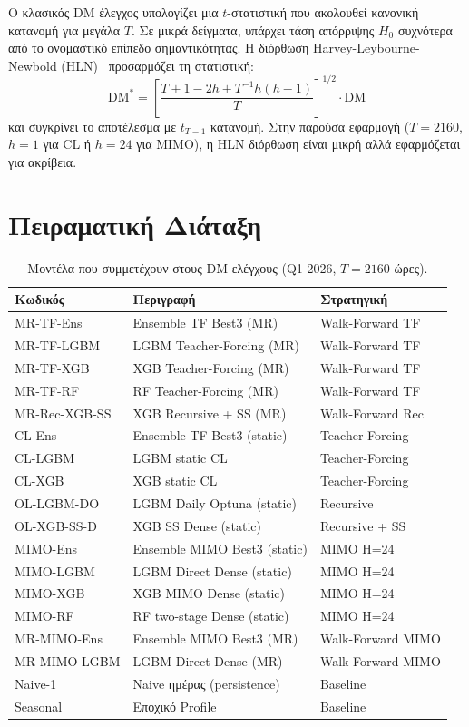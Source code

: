 Ο κλασικός DM έλεγχος υπολογίζει μια $t$-στατιστική που ακολουθεί κανονική
κατανομή για μεγάλα $T$. Σε μικρά δείγματα, υπάρχει τάση απόρριψης $H_0$
συχνότερα από το ονομαστικό επίπεδο σημαντικότητας. Η διόρθωση
Harvey-Leybourne-Newbold (HLN)~\cite{harvey1997} προσαρμόζει τη στατιστική:
\begin{equation}
    \text{DM}^* = \left[\frac{T + 1 - 2h + T^{-1} h(h-1)}{T}\right]^{1/2} \cdot \text{DM}
    \label{eq:hln}
\end{equation}
και συγκρίνει το αποτέλεσμα με $t_{T-1}$ κατανομή. Στην παρούσα εφαρμογή
($T = 2160$, $h = 1$ για CL ή $h = 24$ για MIMO), η HLN διόρθωση είναι μικρή
αλλά εφαρμόζεται για ακρίβεια.

\section{Πειραματική Διάταξη}
\label{sec:dm_setup}

\begin{table}[htbp]
\centering
\caption{Μοντέλα που συμμετέχουν στους DM ελέγχους (Q1 2026, $T=2160$ ώρες).}
\label{tab:dm_models}
\begin{tabular}{lll}
\toprule
\textbf{Κωδικός} & \textbf{Περιγραφή} & \textbf{Στρατηγική} \\
\midrule
MR-TF-Ens    & Ensemble TF Best3 (MR)  & Walk-Forward TF \\
MR-TF-LGBM  & LGBM Teacher-Forcing (MR) & Walk-Forward TF \\
MR-TF-XGB   & XGB Teacher-Forcing (MR) & Walk-Forward TF \\
MR-TF-RF    & RF Teacher-Forcing (MR) & Walk-Forward TF \\
MR-Rec-XGB-SS & XGB Recursive + SS (MR) & Walk-Forward Rec \\
CL-Ens      & Ensemble TF Best3 (static) & Teacher-Forcing \\
CL-LGBM     & LGBM static CL & Teacher-Forcing \\
CL-XGB      & XGB static CL & Teacher-Forcing \\
OL-LGBM-DO  & LGBM Daily Optuna (static) & Recursive \\
OL-XGB-SS-D & XGB SS Dense (static) & Recursive + SS \\
MIMO-Ens    & Ensemble MIMO Best3 (static) & MIMO H=24 \\
MIMO-LGBM   & LGBM Direct Dense (static) & MIMO H=24 \\
MIMO-XGB    & XGB MIMO Dense (static) & MIMO H=24 \\
MIMO-RF     & RF two-stage Dense (static) & MIMO H=24 \\
MR-MIMO-Ens & Ensemble MIMO Best3 (MR) & Walk-Forward MIMO \\
MR-MIMO-LGBM & LGBM Direct Dense (MR) & Walk-Forward MIMO \\
Naive-1     & Naive ημέρας (persistence) & Baseline \\
Seasonal    & Εποχικό Profile & Baseline \\
\bottomrule
\end{tabular}
\end{table}

